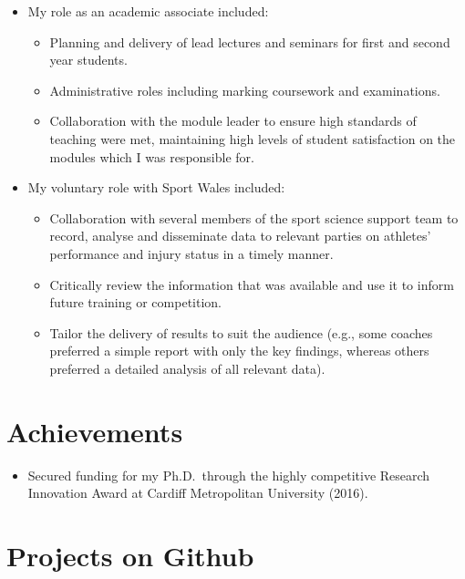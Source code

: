 \documentclass[10pt,a4paper,]{article}
\providecommand{\tightlist}{%
  \setlength{\itemsep}{0pt}\setlength{\parskip}{0pt}}
\begin{document}
\begin{itemize}
\item
  My role as an academic associate included:

  \begin{itemize}
  \tightlist
  \item
    Planning and delivery of lead lectures and seminars for first and second year students.
  \item
    Administrative roles including marking coursework and examinations.
  \item
    Collaboration with the module leader to ensure high standards of teaching were met, maintaining high levels of student satisfaction on the modules which I was responsible for.
  \end{itemize}
\item
  My voluntary role with Sport Wales included:

  \begin{itemize}
  \tightlist
  \item
    Collaboration with several members of the sport science support team to record, analyse and disseminate data to relevant parties on athletes' performance and injury status in a timely manner.
  \item
    Critically review the information that was available and use it to inform future training or competition.
  \item
    Tailor the delivery of results to suit the audience (e.g., some coaches preferred a simple report with only the key findings, whereas others preferred a detailed analysis of all relevant data).
  \end{itemize}
\end{itemize}

\hypertarget{achievements}{%
\section{Achievements}\label{achievements}}

\begin{itemize}
\tightlist
\item
  Secured funding for my Ph.D.~through the highly competitive Research Innovation Award at Cardiff Metropolitan University (2016).
\end{itemize}

\hypertarget{projects-on-github}{%
\section{Projects on Github}\label{projects-on-github}}
\end{document}
